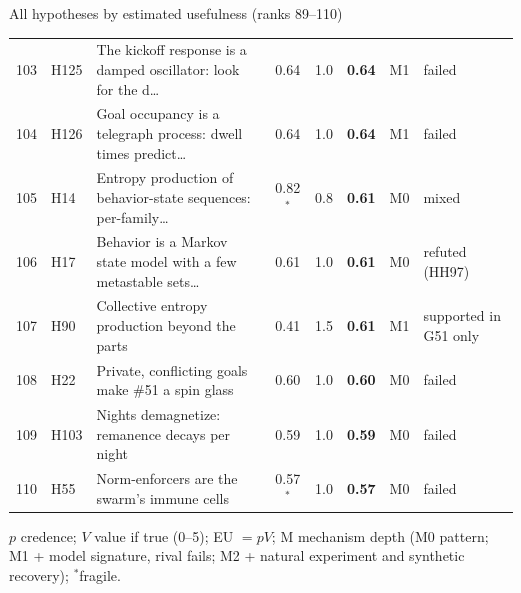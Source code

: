 \begin{frame}{All hypotheses by estimated usefulness (ranks 89--110)}
{\begin{tabular}{@{}rl>{\raggedright\arraybackslash}p{}ccccl@{}}
103 & H125 & The kickoff response is a damped oscillator: look for the d\ldots & 0.64 & 1.0 & \textbf{0.64} & M1 & failed\\
104 & H126 & Goal occupancy is a telegraph process: dwell times predict\ldots & 0.64 & 1.0 & \textbf{0.64} & M1 & failed\\
105 & H14 & Entropy production of behavior-state sequences: per-family\ldots & 0.82$^\ast$ & 0.8 & \textbf{0.61} & M0 & mixed\\
106 & H17 & Behavior is a Markov state model with a few metastable sets\ldots & 0.61 & 1.0 & \textbf{0.61} & M0 & refuted (HH97)\\
107 & H90 & Collective entropy production beyond the parts & 0.41 & 1.5 & \textbf{0.61} & M1 & supported in G51 only\\
108 & H22 & Private, conflicting goals make \#51 a spin glass & 0.60 & 1.0 & \textbf{0.60} & M0 & failed\\
109 & H103 & Nights demagnetize: remanence decays per night & 0.59 & 1.0 & \textbf{0.59} & M0 & failed\\
110 & H55 & Norm-enforcers are the swarm's immune cells & 0.57$^\ast$ & 1.0 & \textbf{0.57} & M0 & failed\\
\end{tabular}}\par\vspace{0.2em}
{\tiny\color{muted}$p$ credence; $V$ value if true (0--5); EU $=pV$; M mechanism depth (M0 pattern; M1 + model signature, rival fails; M2 + natural experiment and synthetic recovery); $^\ast$fragile.}
\end{frame}

